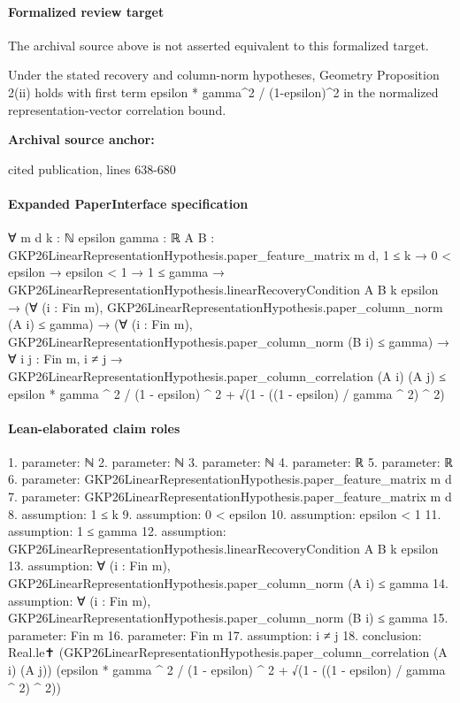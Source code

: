 \documentclass[10pt]{article}
\begin{document}
\paragraph{Formalized review target}
The archival source above is not asserted equivalent to this formalized target.
\begin{ReviewVerbatim}
Under the stated recovery and column-norm hypotheses, Geometry Proposition 2(ii) holds with first term epsilon * gamma^2 / (1-epsilon)^2 in the normalized representation-vector correlation bound.
\end{ReviewVerbatim}

\textbf{Archival source anchor:} {\footnotesize\raggedright cited publication, lines 638-\allowbreak{}680\par}
\paragraph{Expanded PaperInterface specification}
\begin{ReviewVerbatim}
∀ {m d k : ℕ} {epsilon gamma : ℝ} {A B : GKP26LinearRepresentationHypothesis.paper_feature_matrix m d},
  1 ≤ k →
    0 < epsilon →
      epsilon < 1 →
        1 ≤ gamma →
          GKP26LinearRepresentationHypothesis.linearRecoveryCondition A B k epsilon →
            (∀ (i : Fin m), GKP26LinearRepresentationHypothesis.paper_column_norm (A i) ≤ gamma) →
              (∀ (i : Fin m), GKP26LinearRepresentationHypothesis.paper_column_norm (B i) ≤ gamma) →
                ∀ {i j : Fin m},
                  i ≠ j →
                    GKP26LinearRepresentationHypothesis.paper_column_correlation (A i) (A j) ≤
                      epsilon * gamma ^ 2 / (1 - epsilon) ^ 2 + √(1 - ((1 - epsilon) / gamma ^ 2) ^ 2)
\end{ReviewVerbatim}

\paragraph{Lean-elaborated claim roles}\begin{ReviewVerbatim}
1. parameter: ℕ
2. parameter: ℕ
3. parameter: ℕ
4. parameter: ℝ
5. parameter: ℝ
6. parameter: GKP26LinearRepresentationHypothesis.paper_feature_matrix m d
7. parameter: GKP26LinearRepresentationHypothesis.paper_feature_matrix m d
8. assumption: 1 ≤ k
9. assumption: 0 < epsilon
10. assumption: epsilon < 1
11. assumption: 1 ≤ gamma
12. assumption: GKP26LinearRepresentationHypothesis.linearRecoveryCondition A B k epsilon
13. assumption: ∀ (i : Fin m), GKP26LinearRepresentationHypothesis.paper_column_norm (A i) ≤ gamma
14. assumption: ∀ (i : Fin m), GKP26LinearRepresentationHypothesis.paper_column_norm (B i) ≤ gamma
15. parameter: Fin m
16. parameter: Fin m
17. assumption: i ≠ j
18. conclusion: Real.le✝ (GKP26LinearRepresentationHypothesis.paper_column_correlation (A i) (A j))
  (epsilon * gamma ^ 2 / (1 - epsilon) ^ 2 + √(1 - ((1 - epsilon) / gamma ^ 2) ^ 2))
\end{ReviewVerbatim}
\end{document}
